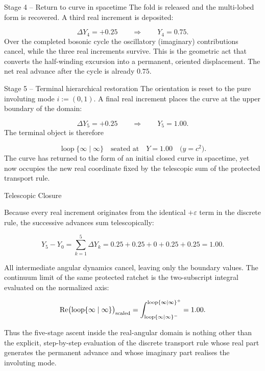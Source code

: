 Stage 4 – Return to curve in spacetime  
The fold is released and the multi-lobed form is recovered. A third real increment is deposited:

\[
\Delta Y_4=+0.25
\qquad\Rightarrow\qquad
Y_4=0.75.
\]
Over the completed bosonic cycle the oscillatory (imaginary) contributions cancel, while the three real increments survive. This is the geometric act that converts the half-winding excursion into a permanent, oriented displacement. The net real advance after the cycle is already \(0.75\).

Stage 5 – Terminal hierarchical restoration  
The orientation is reset to the pure involuting mode \(i:=(0,1)\). A final real increment places the curve at the upper boundary of the domain:

\[
\Delta Y_5=+0.25
\qquad\Rightarrow\qquad
Y_5=1.00.
\]
The terminal object is therefore

\[
\operatorname{loop}\{\infty\mid\infty\}
\quad\text{seated at}\quad
Y=1.00
\quad\bigl(y=c^2\bigr).
\]
The curve has returned to the form of an initial closed curve in spacetime, yet now occupies the new real coordinate fixed by the telescopic sum of the protected transport rule.

Telescopic Closure

Because every real increment originates from the identical \(+\varepsilon\) term in the discrete rule, the successive advances sum telescopically:

\[
Y_5-Y_0
=
\sum_{k=1}^{5}\Delta Y_k
=
0.25+0.25+0+0.25+0.25
=
1.00.
\]

All intermediate angular dynamics cancel, leaving only the boundary values. The continuum limit of the same protected ratchet is the two-subscript integral evaluated on the normalized axis:

\[
\operatorname{Re}\bigl(\operatorname{loop}\{\infty\mid\infty\}\bigr)_{\rm scaled}
=
\int_{\operatorname{loop}\{\infty\mid\infty\}^{-}}^{\operatorname{loop}\{\infty\mid\infty\}^{+}}
=
1.00.
\]

Thus the five-stage ascent inside the real-angular domain is nothing other than the explicit, step-by-step evaluation of the discrete transport rule whose real part generates the permanent advance and whose imaginary part realises the involuting mode.
